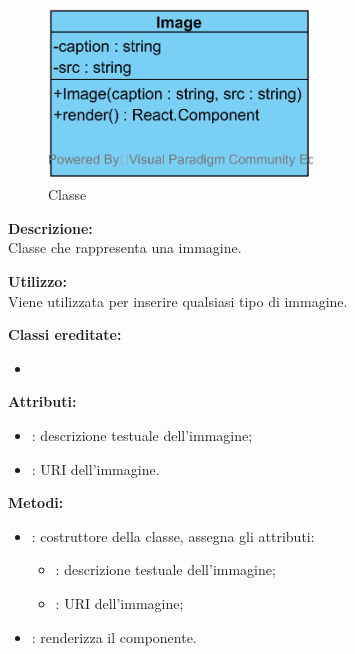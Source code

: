 \paragraph[::Image]{\class}\mbox{}\\ \label{\class}
\begin{figure}[H]
	\centering
	\includegraphics[width=7cm]{./diagrammi/framework/view/gui/image.png}
	\caption{Classe \class}
\end{figure}
\textbf{Descrizione:}\\
Classe che rappresenta una immagine.

\textbf{Utilizzo:}\\
Viene utilizzata per inserire qualsiasi tipo di immagine.

\textbf{Classi ereditate:}
\begin{itemize}
	\item {}
\end{itemize}


\textbf{Attributi:}
\begin{itemize}
	\item {}: descrizione testuale dell'immagine;
	\item {}: URI dell'immagine.
\end{itemize}

\textbf{Metodi:}
\begin{itemize}
	\item {}: costruttore della classe, assegna gli attributi:
	\begin{itemize}
		\item {}: descrizione testuale dell'immagine;
		\item {}: URI dell'immagine;
	\end{itemize}
	\item {}: renderizza il componente.
\end{itemize}

